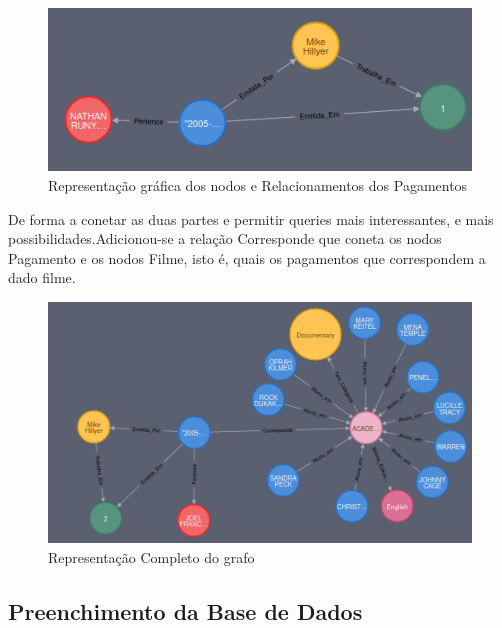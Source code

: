 \begin{figure}[H]

  \centering

  \includegraphics[width=\textwidth]{Pagamento.png}

  \caption {Representação gráfica dos nodos e Relacionamentos dos Pagamentos}

  \label {fig:Pagamento}

\end{figure}

De forma a conetar as duas partes e permitir queries mais interessantes, e mais possibilidades.Adicionou-se a relação Corresponde que coneta os nodos Pagamento e os nodos Filme, isto é, quais os pagamentos que correspondem a dado filme.

\begin{figure}[H]

  \centering

  \includegraphics[width=\textwidth]{Completo.png}

  \caption {Representação Completo do grafo}

  \label {fig:Completa}

\end{figure}




\subsection{Preenchimento da Base de Dados}

